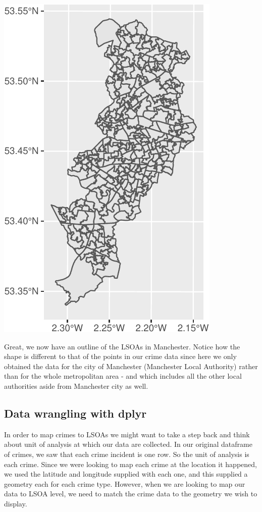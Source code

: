 \documentclass[
]{book}
\begin{document}
\includegraphics{crime_mapping_files/figure-latex/unnamed-chunk-21-1.pdf}

Great, we now have an outline of the LSOAs in Manchester. Notice how the shape is different to that of the points in our crime data since here we only obtained the data for the city of Manchester (Manchester Local Authority) rather than for the whole metropolitan area - and which includes all the other local authorities aside from Manchester city as well.

\hypertarget{data-wrangling-with-dplyr}{%
\subsection{Data wrangling with dplyr}\label{data-wrangling-with-dplyr}}

In order to map crimes to LSOAs we might want to take a step back and think about unit of analysis at which our data are collected. In our original dataframe of crimes, we saw that each crime incident is one row. So the unit of analysis is each crime. Since we were looking to map each crime at the location it happened, we used the latitude and longitude supplied with each one, and this supplied a geometry each for each crime type. However, when we are looking to map our data to LSOA level, we need to match the crime data to the geometry we wish to display.
\end{document}
